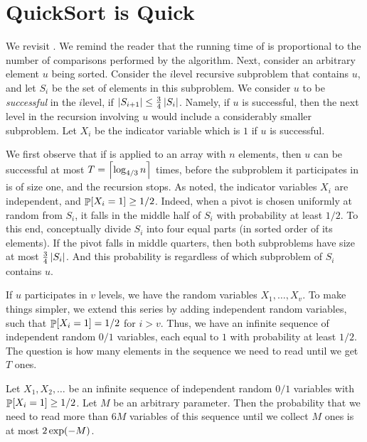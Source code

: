 %

\ChapterPrefix{}
\ChapterGen{}


\section{QuickSort{} is Quick}

We revisit \QuickSort{}. We remind the reader that the running time of
\QuickSort{} is proportional to the number of comparisons performed by
the algorithm. Next, consider an arbitrary element $u$ being
sorted. Consider the $i$\th level recursive subproblem that contains $u$,
and let $S_i$ be the set of elements in this subproblem. We consider $u$
to be \emph{successful} in the $i$\th level, if
$\left| {S_{i+1}} \right| \leq \tfrac{3}{4}\left| {S_i} \right|$. Namely, if $u$ is
successful, then the next level in the recursion involving $u$ would
include a considerably smaller subproblem. Let $X_i$ be the indicator
variable which is $1$ if $u$ is successful.

We first observe that if \QuickSort{} is applied to an array with $n$
elements, then $u$ can be successful at most $T = \left\lceil {\log_{4/3} n} \right\rceil$
times, before the subproblem it participates in is of size one, and the
recursion stops.  As noted, the indicator variables $X_i$ are
independent, and $\Prob{X_i = 1} \geq 1/2$.  Indeed, when a pivot is chosen
uniformly at random from $S_i$, it falls in the middle half of $S_i$ with
probability at least $1/2$. To this end, conceptually divide $S_i$ into
four equal parts (in sorted order of its elements). If the pivot falls in
middle quarters, then both subproblems have size at most
$\tfrac{3}{4}\left| {S_i} \right|$.  And this probability is regardless of which
subproblem of $S_i$ contains $u$.

If $u$ participates in $v$ levels, we have the random variables
$X_1, \ldots, X_v$. To make things simpler, we extend this
series by adding independent random variables, such that
$\Prob{X_i=1}=1/2$ for $i > v$. Thus, we have an infinite sequence
of independent random $0/1$ variables, each equal to $1$ with
probability at least $1/2$. The question is how many elements in the
sequence we need to read until we get $T$ ones.

\begin{lemma}
    Let $X_1, X_2,\ldots$ be an infinite sequence of independent random
    $0/1$ variables with $\Prob{X_i = 1} \geq 1/2$. Let $M$ be an arbitrary
    parameter. Then the probability that we need to read more than $6M$
    variables of this sequence until we collect $M$ ones is at most
    $2\exp \pth{- M}$.
\end{lemma}

